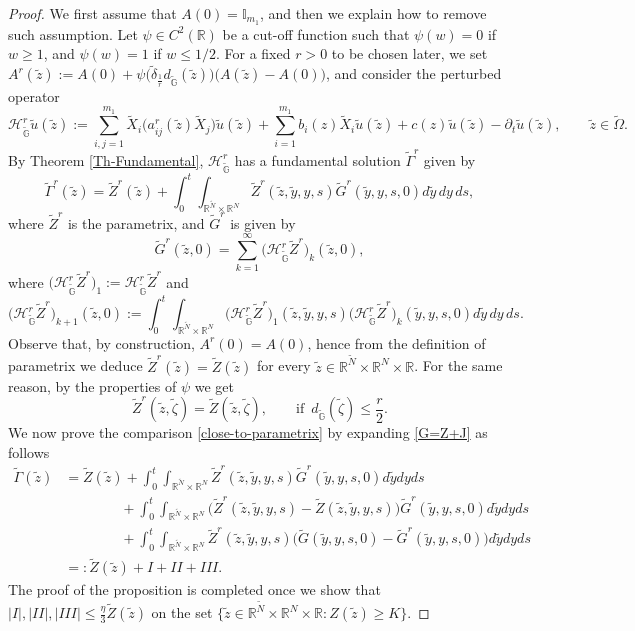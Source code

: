 \documentclass[11pt,a4paper]{article}
\numberwithin{equation}{section}
\newcommand{\R}{\mathbb{R}}
\def \rn {{\mathbb {R}}^{N}}
\def \rnm {{\mathbb {R}}^{\tilde N}}
\def \tt {\tilde}
\def \GG {{\mathbb{G}}}
\def \p {\partial}
\def \ti {\times}
\def \HG {\mathscr{H}_{\tilde\GG}}
\def \G {{\Gamma}}
\def \d {{\delta}}
\def \y {{\eta}}
\def \z {{\zeta}}
\def \O {{\Omega}}
\begin{document}
{{\begin{proof}
	
	We first assume that $A(0)=\mathbb{I}_{m_1}$, and then we explain how to remove such assumption. Let $\psi\in C^2(\R)$ be a cut-off function such that $\psi(w)=0$ if $w\geq 1$, and $\psi(w)=1$ if $w\leq 1/2$. For a fixed $r>0$ to be chosen later, we set $A^r(\tt z):= A(0) + \psi\Big(\tt \d_{\frac{1}{r}}d_{\tt \GG}(\tt z)\Big)\big(A(\tt z)-A(0)\big)$,  and consider the perturbed operator 
	\begin{equation}\label{HGperturbed}
		\HG^r \tilde u(\tt z):=\sum_{i,j=1}^{m_1} \tt X_i\Big(a^r_{ij}(\tt z)\tt X_j\Big)\tt u(\tt z) + \sum_{i=1}^{m_1} b_i(z)\tilde X_i\tilde u(\tt z)+ c(z)\tilde u(\tt z)-\p_t \tilde u(\tt z),\qquad \tt z\in \tilde{\O}.
	\end{equation}
	By Theorem \ref{Th-Fundamental}, $\HG^r$ has a fundamental solution $\tt \G^r$ given by 
	\begin{equation}
		\tt \G^r(\tt z) = \tt Z^r (\tt z) + \int_0^t \int_{\rnm\ti \rn} \tt Z^r(\tt z,\tt y, y, s) \tt G^r(\tt y,y, s,0) d\tt y \,dy \,d s,
	\end{equation}
	where $\tt Z^r$ is the parametrix, and $\tt G^r$ is given by
	\begin{equation}\label{gr}
		\tt G^r(\tt z,0)=\sum_{k=1}^\infty \big(\HG^r \tt Z^r\big)_k(\tt z,0),
	\end{equation}
	where $\big(\HG^r \tt Z^r\big)_1:=\HG^r \tt Z^r$ and 
	\begin{equation}\label{hgkr}
		\big(\HG^r \tt Z^r\big)_{k+1}(\tt z,0):=\int_0^t\int_{\rnm\ti \rn}  \big(\HG^r \tt Z^r\big)_1(\tt z, \tt y,y, s)\big(\HG^r \tt Z^r\big)_k(\tt y,y, s,0)d\tt y \,dy \, d s.
	\end{equation}
	Observe that, by construction, $A^r(0) = A(0)$, hence from the definition of parametrix we deduce $\tt Z^r(\tt z) = \tt Z(\tt z)$ for every $\tilde{z} \in \R^{\tt N}\ti \rn \ti \R$. For the same reason, by the properties of $\psi$ we get
	\begin{equation}\label{parametrix}
		\tt Z^r(\tt z,\tt \z) = \tt Z(\tt z,\tt \z),\qquad \text{if }\, d_{\tt \GG}(\tt \z)\leq \frac{r}{2}.
	\end{equation}
	We now prove the comparison \eqref{close-to-parametrix} by expanding \eqref{G=Z+J} as follows
	\begin{equation}\label{aggiungi-togli}
		\begin{aligned}
			\tt \G(\tt z) &= \tt Z (\tt z) + \int_0^t \int_{\rnm\ti \rn} \tt Z^r(\tt z, \tt y,y, s) \tt G^r(\tt y,y, s,0) d\tt y dy d s \\
			&\qquad \qquad+\int_0^t \int_{\rnm\ti \rn} \Big( \tt Z^r(\tt z, \tt y,y, s)-\tt Z(\tt z,\tt y,y, s)\Big)\tt G^r(\tt y,y, s,0) d\tt y dy d s\\
			&\qquad \qquad+\int_0^t \int_{\rnm\ti \rn} \tt Z^r(\tt z,\tt y,y, s) \Big(\tt G (\tt y,y, s,0) -\tt G^r(\tt y,y, s,0) \Big)d\tt y dy d s \\
			&=:  \tt Z (\tt z)+I+II+III.		
		\end{aligned}
	\end{equation}
	The proof of the proposition is completed once we show that $|I|,|II|,|III|\leq\frac{\y}{3}\tt Z (\tt z)$ on the set $\big\lbrace \tt z \in \rnm\ti \rn\ti\R : Z(\tt z)\geq K \big\rbrace$. 
	

\end{proof}}}
\end{document}
